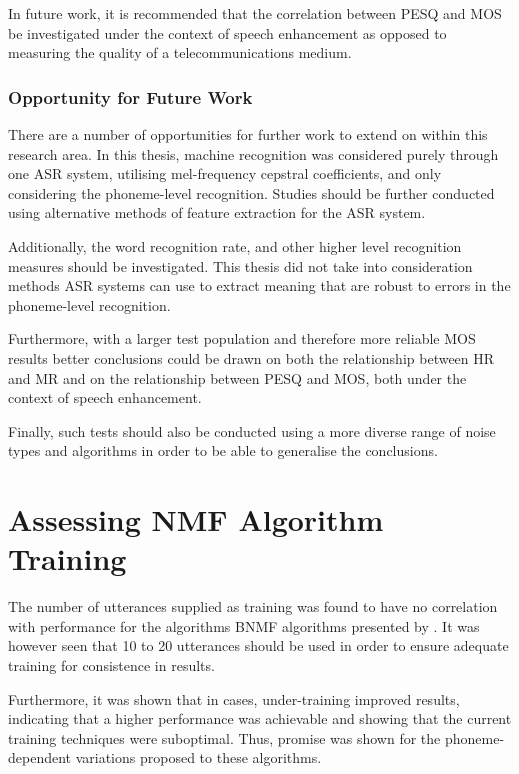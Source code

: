In future work, it is recommended that the correlation between \ac{PESQ}
and \ac{MOS} be investigated under the context of speech enhancement
as opposed to measuring the quality of a telecommunications medium.


\subsubsection*{Opportunity for Future Work}

There are a number of opportunities for further work to extend on
within this research area. In this thesis, machine recognition was
considered purely through one \ac{ASR} system, utilising mel-frequency
cepstral coefficients, and only considering the phoneme-level recognition.
Studies should be further conducted using alternative methods of feature
extraction for the \ac{ASR} system.

Additionally, the word recognition rate, and other higher level recognition
measures should be investigated. This thesis did not take into consideration
methods \ac{ASR} systems can use to extract meaning that are robust
to errors in the phoneme-level recognition.

Furthermore, with a larger test population and therefore more reliable
\ac{MOS} results better conclusions could be drawn on both the relationship
between \ac{HR} and \ac{MR} and on the relationship between \ac{PESQ}
and \ac{MOS}, both under the context of speech enhancement.

Finally, such tests should also be conducted using a more diverse
range of noise types and algorithms in order to be able to generalise
the conclusions.


\section{Assessing \acl{NMF} Algorithm Training}

The number of utterances supplied as training was found to have no
correlation with performance for the algorithms \ac{BNMF} algorithms
presented by \citet{mohammadiha2013supervised}. It was however seen
that 10 to 20 utterances should be used in order to ensure adequate
training for consistence in results.

Furthermore, it was shown that in cases, under-training improved results,
indicating that a higher performance was achievable and showing that
the current training techniques were suboptimal. Thus, promise was
shown for the phoneme-dependent variations proposed to these algorithms.


